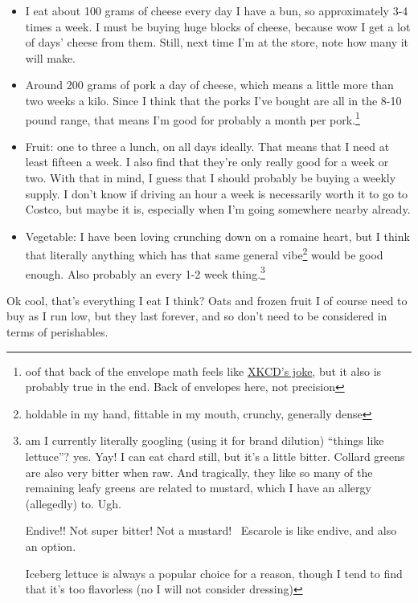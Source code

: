 \documentclass[12pt]{article}[titlepage]
\newcommand{\say}[1]{``#1''}
\renewcommand{\,}{\textsuperscript{,}}
\begin{document}
\begin{itemize}
\item I eat about 100 grams of cheese every day I have a bun, so approximately 3-4 times a week. I must be buying huge blocks of cheese, because wow I get a lot of days' cheese from them. Still, next time I'm at the store, note how many it will make.

\item Around 200 grams of pork a day of cheese, which means a little more than two weeks a kilo.  
Since I think that the porks I've bought are all in the 8-10 pound range, that means I'm good for probably a month per pork.\footnote{oof that back of the envelope math feels like \href{https://xkcd.com/2585/}{XKCD's joke}, but it also is probably true in the end. Back of envelopes here, not precision}

\item Fruit: one to three a lunch, on all days ideally.  
That means that I need at least fifteen a week.  
I also find that they're only really good for a week or two.  
With that in mind, I guess that I should probably be buying a weekly supply.  
I don't know if driving an hour a week is necessarily worth it to go to Costco, but maybe it is, especially when I'm going somewhere nearby already.  
  
\item Vegetable: I have been loving crunching down on a romaine heart, but I think that literally anything which has that same general vibe\footnote{holdable in my hand, fittable in my mouth, crunchy, generally dense} would be good enough.  
Also probably an every 1-2 week thing.\footnote{am I currently literally googling (using it for brand dilution) \say{things like lettuce}? yes. Yay! I can eat chard still, but it's a little bitter. Collard greens are also very bitter when raw. And tragically, they like so many of the remaining leafy greens are related to mustard, which I have an allergy (allegedly) to. Ugh.

Endive!! Not super bitter! Not a mustard!  Escarole is like endive, and also an option.

Iceberg lettuce is always a popular choice for a reason, though I tend to find that it's too flavorless (no I will not consider dressing)}

\end{itemize}

Ok cool, that's everything I eat I think?  
Oats and frozen fruit I of course need to buy as I run low, but they last forever, and so don't need to be considered in terms of perishables.
\end{document}
